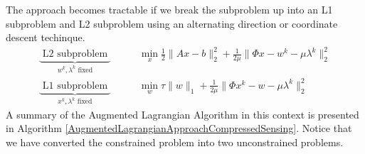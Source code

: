 \documentclass[a4paper]{article}
\begin{document}
The approach becomes tractable if we break the subproblem
up into an L1 subproblem and L2 subproblem using
an alternating direction or coordinate descent techinque.
\[
\begin{split}
\underbrace{\text{ L2 subproblem }}_{w^k , \lambda^k \text{ fixed}}
\qquad
&\min_x 
  \frac{1}{2} \|Ax -b\|_2^2 
+ \frac{1}{2 \mu }\|\Phi x   - w^k - \mu \lambda^k \|_2^2
\\
\underbrace{\text{ L1 subproblem }}_{x^k , \lambda^k \text{ fixed}}
\qquad
& \min_w 
  \tau \|w\|_1
+ \frac{1}{2 \mu }\|\Phi x^k - w   - \mu \lambda^k \|_2^2
\end{split}
\]
A summary of the Augmented Lagrangian Algorithm in this context is presented in 
Algorithm \ref{AugmentedLagrangianApproachCompressedSensing}.
Notice that we have converted the constrained problem
into two unconstrained problems. 
\end{document}
